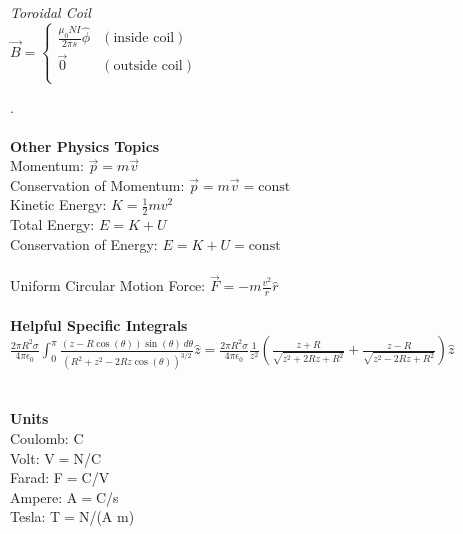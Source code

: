 \documentclass[12pt]{article}
\newcommand{\ds}{\displaystyle}
\begin{document}
\begin{flushleft}
\textit{Toroidal Coil}\\
$\ds\vec{B}=\begin{cases}
    \ds\frac{\mu_0NI}{2\pi s}\hat{\phi} & (\text{inside coil})\\
    \vec{0} & (\text{outside coil})\\
\end{cases}$



.\\~\\

\textbf{Other Physics Topics}\\
Momentum: $\vec{p}=m\vec{v}$\\
Conservation of Momentum: $\vec{p}=m\vec{v}=\text{const}$\\
Kinetic Energy: $K=\frac{1}{2}mv^2$\\
Total Energy: $E=K+U$\\
Conservation of Energy: $E=K+U=\text{const}$\\~\\

Uniform Circular Motion Force: $\ds \vec{F}=-m\frac{v^2}{r}\hat{r}$\\~\\


\textbf{Helpful Specific Integrals}\\
$\ds \frac{2\pi R^2\sigma}{4\pi\epsilon_0}\int_0^{\pi}\frac{(z-R\cos(\theta))\sin(\theta)\,d\theta}{(R^2+z^2-2Rz\cos(\theta))^{3/2}}\hat{z}=\frac{2\pi R^2\sigma}{4\pi\epsilon_0}\frac{1}{z^2}\left(\frac{z+R}{\sqrt{z^2+2Rz+R^2}}+\frac{z-R}{\sqrt{z^2-2Rz+R^2}}\right)\hat{z}$\\~\\~\\


\textbf{Units}\\
Coulomb: C\\
Volt: V$=$N/C\\
Farad: F$=$C/V\\
Ampere: A$=$C/s\\
Tesla: T$=$N/(A m)\\



\newpage





    

    











\end{flushleft}
\end{document}
